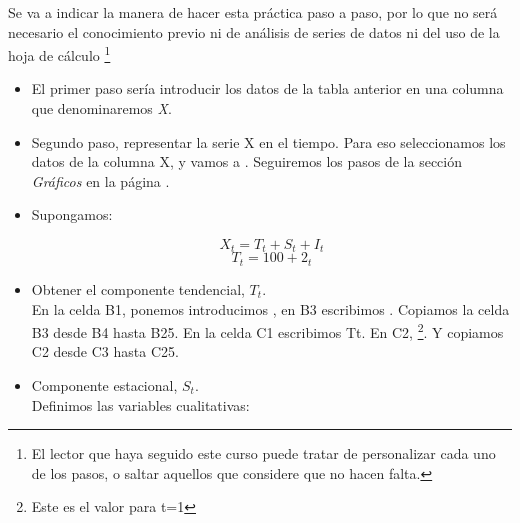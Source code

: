 Se va a indicar la manera de hacer esta práctica paso a paso, por lo
que no será necesario el conocimiento previo ni de análisis de series
de datos ni del uso de la hoja de cálculo \footnote{El lector que haya
seguido este curso puede tratar de personalizar cada uno de los pasos,
o saltar aquellos que considere que no hacen falta.}\\
\begin{itemize}

\item El primer paso sería introducir los datos de la tabla anterior en una
columna que denominaremos \emph{X}.

\item Segundo paso, representar la serie X en el tiempo. Para eso seleccionamos
los datos de la columna X, y vamos a  . Seguiremos
los pasos de la sección \emph{Gráficos} en la página \pageref{Starcalc-graficos}.
\item Supongamos:

\[X_{t}=T_{t}+S_{t}+I_{t}\]
\[T_{t}=100+2_{t}\]

\item Obtener el componente tendencial, \(T_{t}\).\\
En la celda B1, ponemos  introducimos , en B3 escribimos
. Copiamos la celda B3 desde B4 hasta B25. En la celda C1 escribimos
Tt. En C2,  \footnote{Este es el valor para t=1}. Y copiamos
C2 desde C3 hasta C25.

\item Componente estacional, \(S_{t}\).\\
Definimos las variables cualitativas:



\end{itemize}
